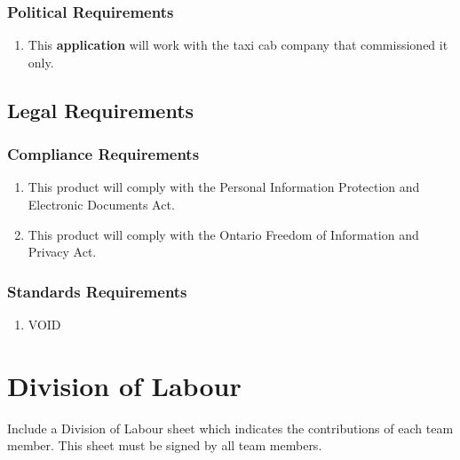\documentclass[english]{article}
\begin{document}
\subsubsection{Political Requirements}
\label{ssub:political_requirements}
\begin{enumerate}[{CP}1. ]
	\item This \textbf{application} will work with the taxi cab company that commissioned it only.
\end{enumerate}


\subsection{Legal Requirements}
\label{sub:legal_requirements}

\subsubsection{Compliance Requirements}
\label{ssub:compliance_requirements}
\begin{enumerate}[{LR}1. ]
	\item This product will comply with the Personal Information Protection and Electronic Documents Act.
	\item This product will comply with the Ontario Freedom of Information and Privacy Act.
\end{enumerate}

\subsubsection{Standards Requirements}
\label{ssub:standards_requirements}
\begin{enumerate}[{LR}1. ]
	\item VOID
\end{enumerate}



\appendix
\section{Division of Labour}
\label{sec:division_of_labour}
Include a Division of Labour sheet which indicates the contributions of each team member. This sheet must be signed by all team members.
\end{document}

